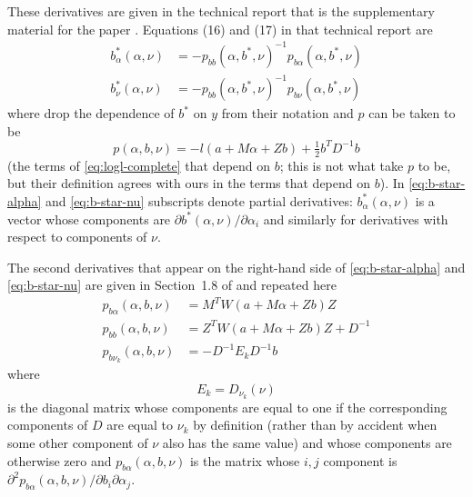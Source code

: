 \documentclass[11pt]{article}
\begin{document}
These derivatives are given in the technical report \citep{tr692} that
is the supplementary material for the paper \citet{reaster}.  Equations
(16) and (17) in that technical report are
\begin{subequations}
\begin{align}
   b^*_\alpha(\alpha, \nu)
   & =
   -
   p_{b b}(\alpha, b^*, \nu)^{-1} p_{b \alpha}(\alpha, b^*, \nu)
   \label{eq:b-star-alpha}
   \\
   b^*_{\nu}(\alpha, \nu)
   & =
   -
   p_{b b}(\alpha, b^*, \nu)^{-1} p_{b \nu}(\alpha, b^*, \nu)
   \label{eq:b-star-nu}
\end{align}
\end{subequations}
where \citet{tr692} drop the dependence of $b^*$ on $y$ from their
notation and $p$
can be taken to be
\begin{equation} \label{eq:pee}
   p(\alpha, b, \nu) =
   - l(a + M \alpha + Z b) + \tfrac{1}{2} b^T D^{-1} b
\end{equation}
(the terms of \eqref{eq:logl-complete} that depend on $b$; this is not
what \citet{tr692} take $p$ to be, but their definition agrees with ours
in the terms that depend on $b$). 
In \eqref{eq:b-star-alpha} and \eqref{eq:b-star-nu} subscripts
denote partial derivatives: $b^*_\alpha(\alpha, \nu)$ is a vector
whose components are $\partial b^*(\alpha, \nu) / \partial \alpha_i$
and similarly for derivatives with respect to components of $\nu$.

The second derivatives that appear on the right-hand side of
\eqref{eq:b-star-alpha} and \eqref{eq:b-star-nu} are given
in Section~1.8 of \citet{tr692} and repeated here
\begin{equation} \label{eq:second-pee}
\begin{split}
   p_{b \alpha}(\alpha, b, \nu)
   & =
   M^T W(a + M \alpha + Z b) Z
   \\
   p_{b b}(\alpha, b, \nu)
   & =
   Z^T W(a + M \alpha + Z b) Z + D^{- 1}
   \\
   p_{b \nu_k}(\alpha, b, \nu)
   & =
   - D^{- 1} E_k D^{- 1} b
\end{split}
\end{equation}
where
\begin{equation*}
   E_k = D_{\nu_k}(\nu)
\end{equation*}
is the diagonal matrix whose components are equal to one
if the corresponding components of $D$ are equal to $\nu_k$ by
definition (rather than by accident when some other component of $\nu$
also has the same value) and whose components are otherwise zero
and $p_{b \alpha}(\alpha, b, \nu)$ is the matrix whose $i, j$ component is
$\partial^2 p_{b \alpha}(\alpha, b, \nu) / \partial b_i \partial \alpha_j$.
\end{document}
